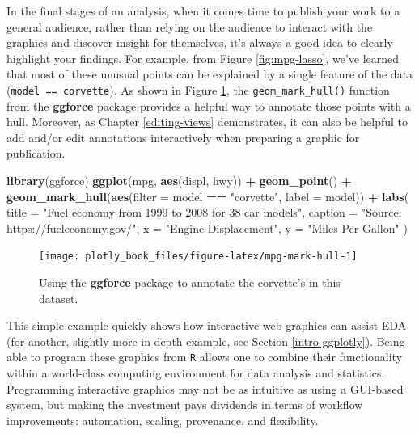\documentclass[
  12pt,
]{krantz}
\newenvironment{Shaded}{\begin{snugshade}}{\end{snugshade}}
\newcommand{\DataTypeTok}[1]{\textcolor[rgb]{0.13,0.29,0.53}{#1}}
\newcommand{\KeywordTok}[1]{\textcolor[rgb]{0.13,0.29,0.53}{\textbf{#1}}}
\newcommand{\NormalTok}[1]{#1}
\newcommand{\OperatorTok}[1]{\textcolor[rgb]{0.81,0.36,0.00}{\textbf{#1}}}
\newcommand{\StringTok}[1]{\textcolor[rgb]{0.31,0.60,0.02}{#1}}
\begin{document}
In the final stages of an analysis, when it comes time to publish your work to a general audience, rather than relying on the audience to interact with the graphics and discover insight for themselves, it's always a good idea to clearly highlight your findings. For example, from Figure \ref{fig:mpg-lasso}, we've learned that most of these unusual points can be explained by a single feature of the data (\texttt{model\ ==\ \textquotesingle{}corvette\textquotesingle{}}). As shown in Figure \ref{fig:mpg-mark-hull}, the \texttt{geom\_mark\_hull()} function from the \textbf{ggforce} package provides a helpful way to annotate those points with a hull. Moreover, as Chapter \ref{editing-views} demonstrates, it can also be helpful to add and/or edit annotations interactively when preparing a graphic for publication.

\begin{Shaded}
\begin{Highlighting}[]
\KeywordTok{library}\NormalTok{(ggforce)}
\KeywordTok{ggplot}\NormalTok{(mpg, }\KeywordTok{aes}\NormalTok{(displ, hwy)) }\OperatorTok{+}\StringTok{ }
\StringTok{  }\KeywordTok{geom_point}\NormalTok{() }\OperatorTok{+}
\StringTok{  }\KeywordTok{geom_mark_hull}\NormalTok{(}\KeywordTok{aes}\NormalTok{(}\DataTypeTok{filter =}\NormalTok{ model }\OperatorTok{==}\StringTok{ "corvette"}\NormalTok{, }\DataTypeTok{label =}\NormalTok{ model)) }\OperatorTok{+}
\StringTok{  }\KeywordTok{labs}\NormalTok{(}
    \DataTypeTok{title =} \StringTok{"Fuel economy from 1999 to 2008 for 38 car models"}\NormalTok{,}
    \DataTypeTok{caption =} \StringTok{"Source: https://fueleconomy.gov/"}\NormalTok{,}
    \DataTypeTok{x =} \StringTok{"Engine Displacement"}\NormalTok{, }
    \DataTypeTok{y =} \StringTok{"Miles Per Gallon"}
\NormalTok{  )}
\end{Highlighting}
\end{Shaded}

\begin{figure}

{\centering \texttt{[image: plotly\_book\_files/figure-latex/mpg-mark-hull-1]} 

}

\caption{Using the \textbf{ggforce} package to annotate the corvette's in this dataset.}\label{fig:mpg-mark-hull}
\end{figure}

This simple example quickly shows how interactive web graphics can assist EDA (for another, slightly more in-depth example, see Section \ref{intro-ggplotly}). Being able to program these graphics from \texttt{R} allows one to combine their functionality within a world-class computing environment for data analysis and statistics. Programming interactive graphics may not be as intuitive as using a GUI-based system, but making the investment pays dividends in terms of workflow improvements: automation, scaling, provenance, and flexibility.
\end{document}
